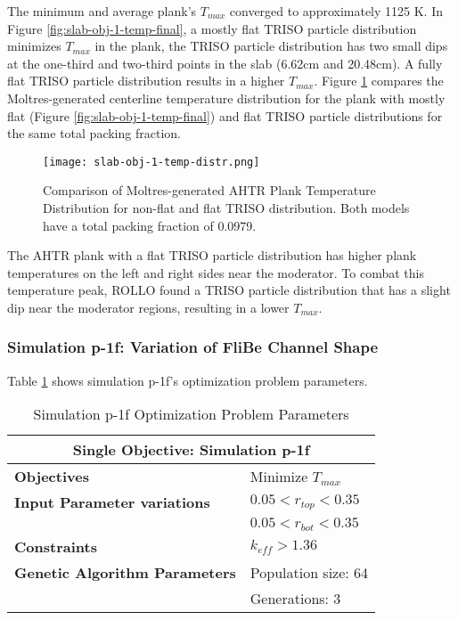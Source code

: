 The minimum and average plank's $T_{max}$ converged to approximately 
1125 K. 
In Figure \ref{fig:slab-obj-1-temp-final}, a mostly flat TRISO 
particle distribution minimizes $T_{max}$ in the plank, the TRISO particle distribution 
has two small dips at the one-third and two-third points in the slab (6.62cm and 20.48cm). 
A fully flat TRISO particle distribution results in a higher $T_{max}$.
Figure \ref{fig:slab-obj-1-temp-distr} compares the Moltres-generated centerline 
temperature distribution for the plank with mostly flat (Figure 
\ref{fig:slab-obj-1-temp-final}) and flat TRISO particle distributions for the same 
total packing fraction.
\begin{figure}[htbp]
    \centering
    \texttt{[image: slab-obj-1-temp-distr.png]}
    \caption{Comparison of Moltres-generated AHTR Plank Temperature Distribution for non-flat and flat
    TRISO distribution. Both models have a total packing fraction of 0.0979.}
    \label{fig:slab-obj-1-temp-distr}
\end{figure}
The AHTR plank with a flat TRISO particle distribution has higher plank temperatures 
on the left and right sides near the moderator. 
To combat this temperature peak, ROLLO found a TRISO particle distribution that 
has a slight dip near the moderator regions, resulting in a lower $T_{max}$.

\subsubsection{Simulation p-1f: Variation of FliBe Channel Shape}
Table \ref{tab:simulationp1f} shows simulation p-1f's optimization problem parameters. 
\begin{table}[htbp]
    \centering
    \onehalfspacing
    \caption{Simulation p-1f Optimization Problem Parameters}
	\label{tab:simulationp1f}
    \footnotesize
    \begin{tabular}{l|p{3cm}}
    \hline 
    \multicolumn{2}{c}{\textbf{Single Objective: Simulation p-1f}} \\
    \hline 
    \textbf{Objectives} & Minimize $T_{max}$ \\
    \hline 
    \textbf{Input Parameter variations} & $0.05<r_{top}<0.35$ \\
    & $0.05<r_{bot}<0.35$ \\
    \hline
    \textbf{Constraints} & $k_{eff} > 1.36$\\ 
    \hline 
    \textbf{Genetic Algorithm Parameters} & Population size: 64 \\
    & Generations: 3 \\
    \hline
    \end{tabular}
\end{table}


